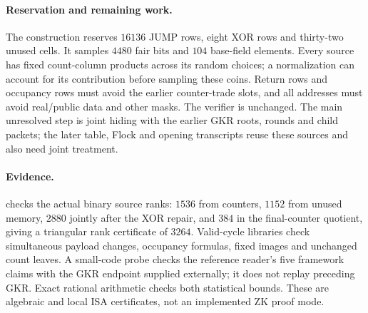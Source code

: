 \documentclass[11pt]{article}
\begin{document}
\paragraph{Reservation and remaining work.} The construction reserves $16136$ JUMP rows, eight XOR rows and thirty-two unused cells. It samples $4480$ fair bits and $104$ base-field elements. Every source has fixed count-column products across its random choices; a normalization can account for its contribution before sampling these coins. Return rows and occupancy rows must avoid the earlier counter-trade slots, and all addresses must avoid real/public data and other masks. The verifier is unchanged. The main unresolved step is joint hiding with the earlier GKR roots, rounds and child packets; the later table, Flock and opening transcripts reuse these sources and also need joint treatment.

\paragraph{Evidence.}  checks the actual binary source ranks: $1536$ from counters, $1152$ from unused memory, $2880$ jointly after the XOR repair, and $384$ in the final-counter quotient, giving a triangular rank certificate of $3264$. Valid-cycle libraries check simultaneous payload changes, occupancy formulas, fixed images and unchanged count leaves. A small-code probe checks the reference reader's five framework claims with the GKR endpoint supplied externally; it does not replay preceding GKR. Exact rational arithmetic checks both statistical bounds. These are algebraic and local ISA certificates, not an implemented ZK proof mode.
\end{document}
